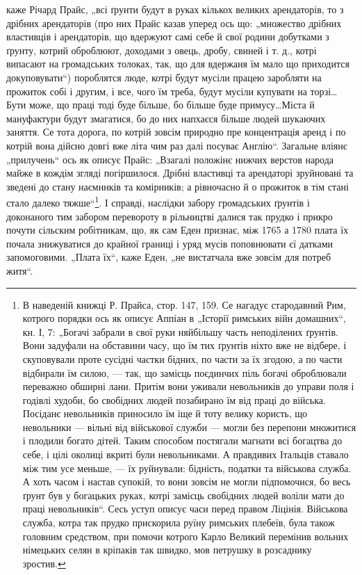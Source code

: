\parcont{}
каже Річард Прайс, „всі ґрунти будут в руках кількох великих арендаторів, то з дрібних арендаторів
(про них Прайс казав уперед ось що: „множество дрібних властивців і арендаторів, що вдержуют самі
себе й свої родини добутками з ґрунту, котрий оброблюют, доходами з овець, дробу, свиней і т. д.,
котрі випасают на громадських толоках, так, що для вдержаня їм мало що приходится докуповувати“)
пороблятся люде, котрі будут мусіли працею заробляти на прожиток собі і другим, і все, чого їм
треба, будут мусіли
купувати на торзі\dots Бути може, що праці тоді буде більше, бо більше буде примусу\dots Міста й
мануфактури будут змагатися, бо до них напхаєся більше людей шукаючих заняття. Се тота дорога, по
котрій зовсім природно пре концентрація аренд і по котрій вона дійсно довгі вже літа чим раз далі
посуває Англію“. Загальне вліянє „прилучень“ ось як описує Прайс: „Взагалі положінє нижчих верстов
народа майже в кождім згляді погіршилося. Дрібні властивці та арендаторі зруйновані та зведені до
стану наємннків та комірників; а рівночасно й о прожиток в тім стані стало далеко тяжше“\footnote{
В наведеній книжці Р. Прайса, стор. 147, 159. Се нагадує стародавний Рим, котрого порядки ось як
описує Аппіан в „Історії римських війн домашних“, кн. І, 7: „Богачі забрали в свої руки няйбільшу
часть
неподілених ґрунтів. Вони задуфали на обставини часу, що їм тих ґрунтів ніхто вже не відбере, і
скуповували проте сусідні частки бідних, по
части за їх згодою, а по части відбирали їм силою, — так, що замісць
поєдинчих  піль богачі оброблювали переважно обширні лани. Притім
вони уживали невольників до управи поля і годівлі худоби, бо свобідних
людей позабирано  їм від праці до війська. Посіданє невольників приносило їм іще й тоту велику
користь, що невольники — вільні від військової служби — могли без перепони множитися і плодили
богато дітей. Таким способом постягали магнати всі богацтва до себе, і цілі околиці вкриті були
невольниками. А правдивих Італьців ставало між тим усе меньше, — їх руйнували: бідність, податки та
військова служба. А хоть часом і настав супокій, то вони зовсім не могли підпомочися, бо весь ґрунт
був у богацьких руках, котрі замісць свобідних людей воліли мати до праці невольників“. Сесь уступ
описує часи перед правом Ліцінія. Військова служба, котра так прудко прискорила руїну римських
плебеїв, була також головним средством, при помочи котрого Карло Великий перемінив вольних німецьких
селян в кріпаків так швидко, мов петрушку в розсаднику зростив.
}. І
справді, наслідки забору громадських ґрунтів і доконаного тим забором перевороту в рільництві далися
так прудко і прикро почути сільским робітникам, що, як сам Еден признає, між 1765 а 1780 плата їх
почала знижуватися до крайної границі і уряд мусів поповнювати єї датками запомоговими. „Плата їх“,
каже Еден, „не вистатчала вже зовсім для потреб житя“.

